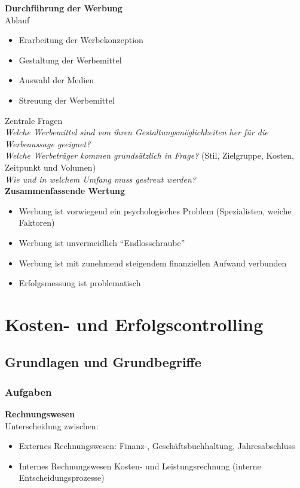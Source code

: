 \documentclass[a4paper,11pt, twoside]{article}
\begin{document}
\textbf{Durchführung der Werbung}\\
Ablauf
\begin{itemize}
	\item Erarbeitung der Werbekonzeption
	\item Gestaltung der Werbemittel
	\item Auswahl der Medien
	\item Streuung der Werbemittel
\end{itemize}

Zentrale Fragen\\
\textit{Welche Werbemittel sind von ihren Gestaltungsmöglichkeiten her für die Werbeaussage geeignet?}\\
\textit{Welche Werbeträger kommen grundsätzlich in Frage?} (Stil, Zielgruppe, Kosten, Zeitpunkt und Volumen)\\
\textit{Wie und in welchem Umfang muss gestreut werden?}\\

\textbf{Zusammenfassende Wertung}
\begin{itemize}
	\item Werbung ist vorwiegend ein psychologisches Problem (Spezialisten, weiche Faktoren)
	\item Werbung ist unvermeidlich "`Endlosschraube"'
	\item Werbung ist mit zunehmend steigendem finanziellen Aufwand verbunden
	\item Erfolgsmessung ist problematisch	
\end{itemize}

\newpage
\section{Kosten- und Erfolgscontrolling}

\subsection{Grundlagen und Grundbegriffe}

\subsubsection*{Aufgaben}
\textbf{Rechnungswesen}\\
Unterscheidung zwischen:
\begin{itemize}
	\item Externes Rechnungswesen: Finanz-, Geschäftsbuchhaltung, Jahresabschluss
	\item Internes Rechnungswesen Kosten- und Leistungsrechnung (interne Entscheidungsprozesse)
\end{itemize}
\end{document}
